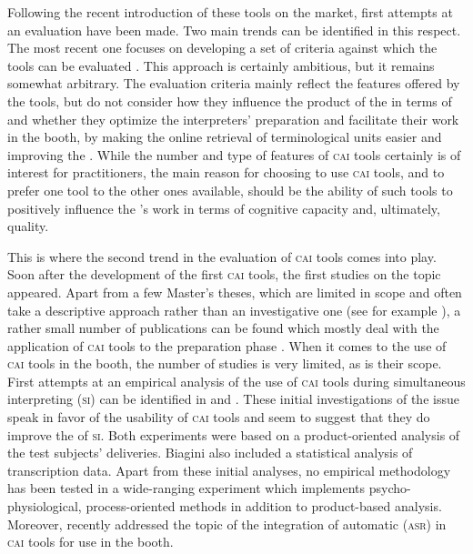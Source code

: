 \documentclass[output=paper]{langsci/langscibook}
\begin{document}
Following the recent introduction of these tools on the market, first attempts at an evaluation have been made. Two main trends can be identified in this respect. The most recent one focuses on developing a set of criteria against which the tools can be evaluated \citep{Costa2016, Will2015}. This approach is certainly ambitious, but it remains somewhat arbitrary. The evaluation criteria mainly reflect the features offered by the tools, but do not consider how they influence the product of the  in terms of  and whether they optimize the interpreters’ preparation and facilitate their work in the booth, by making the online retrieval of terminological units easier and improving the . While the number and type of features of \textsc{cai} tools certainly is of interest for practitioners, the main reason for choosing to use \textsc{cai} tools, and to prefer one tool to the other ones available, should be the ability of such tools to positively influence the ’s work in terms of cognitive capacity and, ultimately, quality. 

This is where the second trend in the evaluation of \textsc{cai} tools comes into play. Soon after the development of the first \textsc{cai} tools, the first studies on the topic appeared. Apart from a few Master’s theses, which are limited in scope and often take a descriptive approach rather than an investigative one (see for example \citealt{DeMerulis2013}), a rather small number of publications can be found which mostly deal with the application of \textsc{cai} tools to the preparation phase \citep{Xu2015, Fantinuoli2017a}. When it comes to the use of \textsc{cai} tools in the booth, the number of studies is very limited, as is their scope. First attempts at an empirical analysis of the use of \textsc{cai} tools during simultaneous interpreting (\textsc{si}) can be identified in \citet{Prandi2015a, Prandi2015b} and  \citet{Biagini2015}. These initial investigations of the issue speak in favor of the usability of \textsc{cai} tools and seem to suggest that they do improve the  of \textsc{si}. Both experiments were based on a product-oriented analysis of the test subjects’ deliveries. Biagini also included a statistical analysis of transcription data. Apart from these initial analyses, no empirical methodology has been tested in a wide-ranging experiment which implements psycho-physiological, process-oriented methods in addition to product-based analysis. Moreover, \citet{Fantinuoli2017b} recently addressed the topic of the integration of automatic  (\textsc{asr}) in \textsc{cai} tools for use in the booth.
\end{document}
